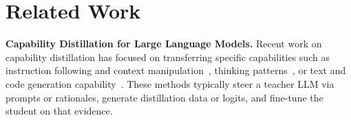 






\section{Related Work}
\label{sec:relate}

\textbf{Capability Distillation for Large Language Models.}\label{sec:relate_kd}
Recent work on capability distillation has focused on transferring specific capabilities such as instruction following and context manipulation~\citep{taori2023stanford, chiang2023vicuna, peng2023instruction, xu2023wizardlm}, thinking patterns~\citep{zhang2024knowledgeable, cheng2023adapting}, or text and code generation capability~\citep{zhang2025recommendation, li2023starcoder}. These methods typically steer a teacher LLM via prompts or rationales, generate distillation data or logits, and fine-tune the student on that evidence. 

